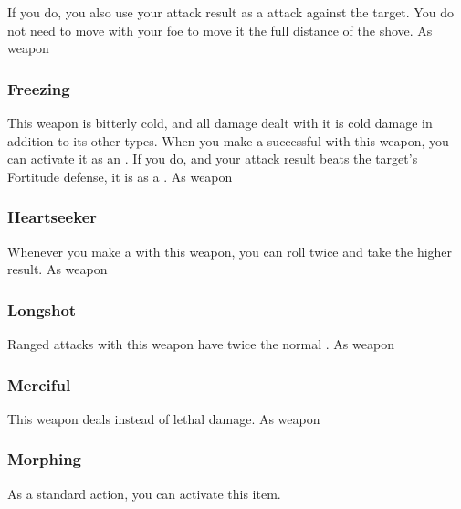 If you do, you also use your attack result as a  attack against the target.
You do not need to move with your foe to move it the full distance of the shove.
 
 As weapon
\lowercase{\hypertarget{item:Freezing}{}}\label{item:Freezing}
\hypertarget{item:Freezing}{\subsubsection{Freezing\hfill{}}}
This weapon is bitterly cold, and all damage dealt with it is cold damage in addition to its other types.
When you make a successful  with this weapon, you can activate it as an .
If you do, and your attack result beats the target's Fortitude defense, it is \fatigued as a .
 
 As weapon
\lowercase{\hypertarget{item:Heartseeker}{}}\label{item:Heartseeker}
\hypertarget{item:Heartseeker}{\subsubsection{Heartseeker\hfill{}}}
Whenever you make a  with this weapon, you can roll twice and take the higher result.
 
 As weapon
\lowercase{\hypertarget{item:Longshot}{}}\label{item:Longshot}
\hypertarget{item:Longshot}{\subsubsection{Longshot\hfill{}}}
Ranged attacks with this weapon have twice the normal .
 
 As weapon
\lowercase{\hypertarget{item:Merciful}{}}\label{item:Merciful}
\hypertarget{item:Merciful}{\subsubsection{Merciful\hfill{}}}
This weapon deals  instead of lethal damage.
 
 As weapon
\lowercase{\hypertarget{item:Morphing}{}}\label{item:Morphing}
\hypertarget{item:Morphing}{\subsubsection{Morphing\hfill{}}}
As a standard action, you can activate this item.
